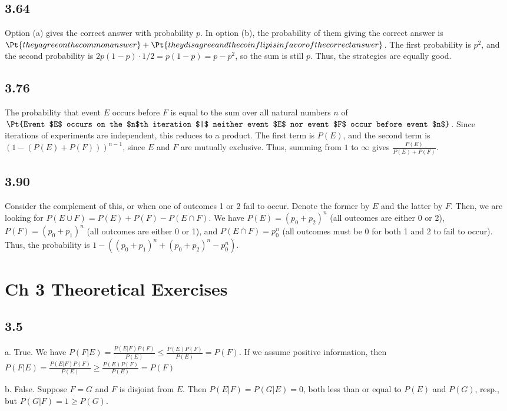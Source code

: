 \documentclass{article}
\begin{document}
\subsection*{3.64}
Option (a) gives the correct answer with probability $p$. In option (b), the probability of them giving the correct answer is $\Pt{they agree on the common answer}+\Pt{they disagree and the coin flip is in favor of the correct answer}$. The first probability is $p^2$, and the second probability is $2p(1-p)\cdot1/2=p(1-p)=p-p^2$, so the sum is still $p$. Thus, the strategies are equally good.
\subsection*{3.76}
The probability that event $E$ occurs before $F$ is equal to the sum over all natural numbers $n$ of $\Pt{Event $E$ occurs on the $n$th iteration $|$ neither event $E$ nor event $F$ occur before event $n$}$. Since iterations of experiments are independent, this reduces to a product. The first term is $P(E)$, and the second term is $(1-(P(E)+P(F)))^{n-1}$, since $E$ and $F$ are mutually exclusive. Thus, summing from $1$ to $\infty$ gives $\frac{P(E)}{P(E)+P(F)}$.
\subsection*{3.90}
Consider the complement of this, or when one of outcomes 1 or 2 fail to occur. Denote the former by $E$ and the latter by $F$. Then, we are looking for $P(E\cup F)=P(E)+P(F)-P(E\cap F)$. We have $P(E)=(p_0+p_2)^n$ (all outcomes are either 0 or 2), $P(F)=(p_0+p_1)^n$ (all outcomes are either 0 or 1), and $P(E\cap F)=p_0^n$ (all outcomes must be 0 for both 1 and 2 to fail to occur). Thus, the probability is $1-((p_0+p_1)^n+(p_0+p_2)^n-p_0^n)$.
\section*{Ch 3 Theoretical Exercises}
\subsection*{3.5}
a. True. We have $P(F|E)=\frac{P(E|F)P(F)}{P(E)}\leq\frac{P(E)P(F)}{P(E)}=P(F)$. If we assume positive information, then $P(F|E)=\frac{P(E|F)P(F)}{P(E)}\geq\frac{P(E)P(F)}{P(E)}=P(F)$

b. False. Suppose $F=G$ and $F$ is disjoint from $E$. Then $P(E|F)=P(G|E)=0$, both less than or equal to $P(E)$ and $P(G)$, resp., but $P(G|F)=1\geq P(G)$.
\end{document}

